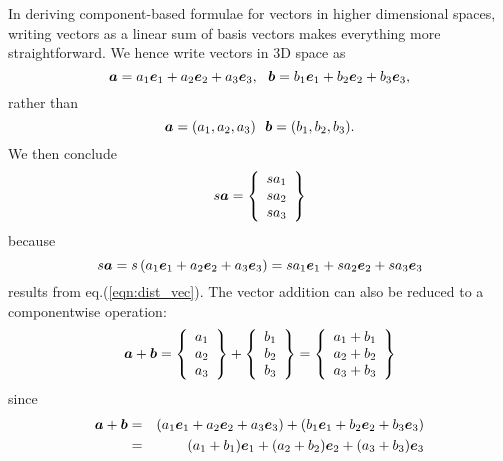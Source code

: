 \documentclass[10pt,a4j]{article}
\begin{document}
In deriving component-based formulae for vectors in higher dimensional spaces, writing vectors as a linear sum of basis vectors makes everything more straightforward. We hence write vectors in 3D space as 
\begin{equation}
    \fat{a}= a_1\fat{e}_1+ a_2\fat{e}_2+ a_3\fat{e}_3, \ \ 
    \fat{b}= b_1\fat{e}_1+ b_2\fat{e}_2+ b_3\fat{e}_3, 
    \label{eqn:}
\end{equation}
rather than 
\begin{equation}
    \fat{a}= (a_1,  a_2, a_3) \ \ 
    \fat{b}= (b_1,  b_2, b_3).
\end{equation}
We then conclude 
\begin{equation}
    s\mbox{\boldmath $a$}
    =
    \left\{
        \begin{array}{c}
            sa_1 \\
            sa_2 \\
            sa_3 
        \end{array}
    \right\}
    \label{eqn:}
\end{equation}
because 
\begin{equation}
    s\mbox{\boldmath $a$}= s \left(a_1\mbox{\boldmath $e$}_1+ a_2\mbox{\boldmath $e$}_2+ a_3\mbox{\boldmath $e$}_3\right)
    =sa_1\mbox{\boldmath $e$}_1+ sa_2\mbox{\boldmath $e$}_2+ sa_3\mbox{\boldmath $e$}_3
    \label{eqn:}
\end{equation}
results from eq.(\ref{eqn:dist_vec}). The vector addition can also be reduced to a componentwise operation:
\begin{equation}
    \mbox{\boldmath $a$}
    +
    \mbox{\boldmath $b$}
    =
    \left\{
        \begin{array}{c}
            a_1 \\
            a_2 \\
            a_3 
        \end{array}
    \right\}
    +
    \left\{
        \begin{array}{c}
            b_1 \\
            b_2 \\
            b_3 
        \end{array}
    \right\}
    =
    \left\{
        \begin{array}{c}
            a_1+b_1 \\
            a_2+b_2 \\
            a_3+b_3
        \end{array}
    \right\}
    \label{eqn:}
\end{equation}
since 
\begin{eqnarray}
    \mbox{\boldmath $a$}+\mbox{\boldmath $b$}
    &=&
    \left(a_1\mbox{\boldmath $e$}_1+ a_2\mbox{\boldmath $e$}_2+ a_3\mbox{\boldmath $e$}_3 \right)+
    \left(b_1\mbox{\boldmath $e$}_1+ b_2\mbox{\boldmath $e$}_2+ b_3\mbox{\boldmath $e$}_3 \right) \\
    &=&
    (a_1+b_1)\mbox{\boldmath $e$}_1
    +
    (a_2+b_2)\mbox{\boldmath $e$}_2
    +
    (a_3+b_3)\mbox{\boldmath $e$}_3
    \label{eqn:}
\end{eqnarray}
\end{document}
